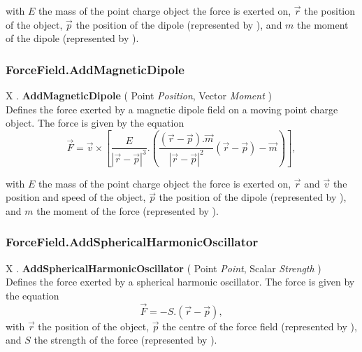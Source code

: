 with $E$ the mass of the point charge object the force is exerted on, $\vec{r}$ the position of the object, $\vec{p}$ the position of the dipole (represented by ), and $m$ the moment of the dipole (represented by ).


\subsubsection{ForceField.AddMagneticDipole \label{F:ForceField:AddMagneticDipole}}
X . \textbf{AddMagneticDipole} ( Point \textit{Position}, Vector \textit{Moment} ) \\
Defines the force exerted by a magnetic dipole field on a moving point charge object.
The force is given by the equation
\begin{equation}
\vec{F}=
\vec{v} \times
\left[
 \frac{E}{|\vec{r}-\vec{p}|^3} . 
\left(
 \frac{(\vec{r}-\vec{p}).\vec{m}}{|\vec{r}-\vec{p}|^2} (\vec{r}-\vec{p})
  - \vec{m} 
\right)
\right] ,
\end{equation}

with $E$ the mass of the point charge object the force is exerted on, $\vec{r}$ and $\vec{v}$ the position and speed of the object, $\vec{p}$ the position of the dipole (represented by ), and $m$ the moment of the force (represented by ).


\subsubsection{ForceField.AddSphericalHarmonicOscillator \label{F:ForceField:AddSphericalHarmonicOscillator}}
X . \textbf{AddSphericalHarmonicOscillator} ( Point \textit{Point}, Scalar \textit{Strength} ) \\
Defines the force exerted by a spherical harmonic oscillator.
The force is given by the equation
\begin{equation}
\vec{F}= - S . (\vec{r}-\vec{p}),
\end{equation}
with $\vec{r}$ the position of the object, $\vec{p}$ the centre of the force field (represented by ), and $S$ the strength of the force (represented by ).



